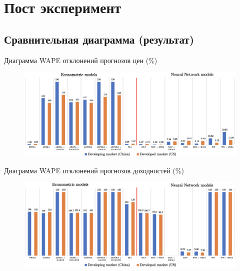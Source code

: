 \documentclass[11pt, aspectratio= 169]{beamer}
\begin{document}
	\section{Пост эксперимент}
	\subsection{Сравнительная диаграмма (результат)}
	\begin{frame}{Диаграмма WAPE отклонений прогнозов цен (\%)}
		\begin{figure}[H]
			\includegraphics[width= 14cm]{table_prices.png}
		\end{figure}
	\end{frame}

	\begin{frame}{Диаграмма WAPE отклонений прогнозов доходностей (\%)}
		\begin{figure}[H]
			\includegraphics[width= 14cm]{table_returns.png}
		\end{figure}
	\end{frame}
	
\end{document}
